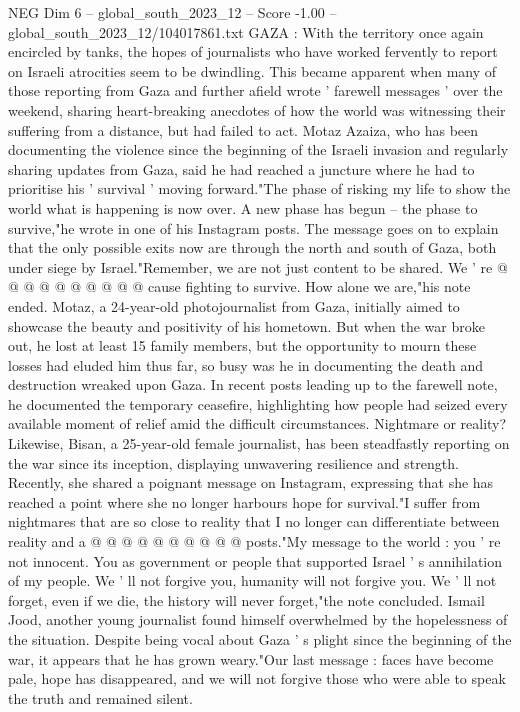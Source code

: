 \begin{textsample}{NEG Dim 6 – global\_south\_2023\_12 – Score -1.00 – global\_south\_2023\_12/104017861.txt}  \label{ex:f6_neg_347}
GAZA : With the territory once again encircled by tanks, the hopes of journalists who have worked fervently to report on Israeli atrocities seem to be dwindling.
This became apparent when many of those reporting from Gaza and further afield wrote ' farewell messages ' over the weekend, sharing heart-breaking anecdotes of how the world was witnessing their suffering from a distance, but had failed to act.
Motaz Azaiza, who has been documenting the violence since the beginning of the Israeli invasion and regularly sharing updates from Gaza, said he had reached a juncture where he had to prioritise his ' survival ' moving forward."The phase of risking my life to show the world what is happening is now over.
A new phase has begun -- the phase to survive,"he wrote in one of his Instagram posts.
The message goes on to explain that the only possible exits now are through the north and south of Gaza, both under siege by Israel."Remember, we are not just content to be shared.
We ' re @ @ @ @ @ @ @ @ @ @ cause fighting to survive.
How alone we are,"his note ended.
Motaz, a 24-year-old photojournalist from Gaza, initially aimed to showcase the beauty and positivity of his hometown.
But when the war broke out, he lost at least 15 family members, but the opportunity to mourn these losses had eluded him thus far, so busy was he in documenting the death and destruction wreaked upon Gaza.
In recent posts leading up to the farewell note, he documented the temporary ceasefire, highlighting how people had seized every available moment of relief amid the difficult circumstances.
Nightmare or reality?
Likewise, Bisan, a 25-year-old female journalist, has been steadfastly reporting on the war since its inception, displaying unwavering resilience and strength.
Recently, she shared a poignant message on Instagram, expressing that she has reached a point where she no longer harbours hope for survival."I suffer from nightmares that are so close to reality that I no longer can differentiate between reality and a @ @ @ @ @ @ @ @ @ @ posts."My message to the world : you ' re not innocent.
You as government or people that supported Israel ' s annihilation of my people.
We ' ll not forgive you, humanity will not forgive you.
We ' ll not forget, even if we die, the history will never forget,"the note concluded.
Ismail Jood, another young journalist found himself overwhelmed by the hopelessness of the situation.
Despite being vocal about Gaza ' s plight since the beginning of the war, it appears that he has grown weary."Our last message : faces have become pale, hope has disappeared, and we will not forgive those who were able to speak the truth and remained silent.

\end{textsample}
